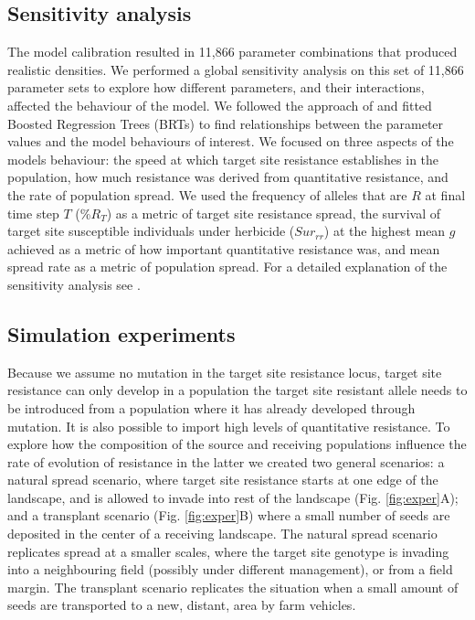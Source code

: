 \documentclass[10pt,letterpaper]{article}
\begin{document}
\subsection*{Sensitivity analysis}
The model calibration resulted in 11,866 parameter combinations that produced realistic densities. We performed a global sensitivity analysis on this set of 11,866 parameter sets to explore how different parameters, and their interactions, affected the behaviour of the model. We followed the approach of \cite{Cout2014} and fitted Boosted Regression Trees (BRTs) to find relationships between the parameter values and the model behaviours of interest. We focused on three aspects of the models behaviour: the speed at which target site resistance establishes in the population, how much resistance was derived from quantitative resistance, and the rate of population spread. We used the frequency of alleles that are $R$ at final time step $T$ (\%$R_T$) as a metric of target site resistance spread, the survival of target site susceptible individuals under herbicide ($Sur_{rr}$) at the highest mean $g$ achieved as a metric of how important quantitative resistance was, and mean spread rate as a metric of population spread. For a detailed explanation of the sensitivity analysis see .

\subsection*{Simulation experiments}
Because we assume no mutation in the target site resistance locus, target site resistance can only develop in a population the target site resistant allele needs to be introduced from a population where it has already developed through mutation. It is also possible to import high levels of quantitative resistance. To explore how the composition of the source and receiving populations influence the rate of evolution of resistance in the latter we created two general scenarios: a natural spread scenario, where target site resistance starts at one edge of the landscape, and is allowed to invade into rest of the landscape (Fig. \ref{fig:exper}A); and a transplant scenario (Fig. \ref{fig:exper}B) where a small number of seeds are deposited in the center of a receiving landscape. The natural spread scenario replicates spread at a smaller scales, where the target site genotype is invading into a neighbouring field (possibly under different management), or from a field margin. The transplant scenario replicates the situation when a small amount of seeds are transported to a new, distant, area by farm vehicles. 
\end{document}

